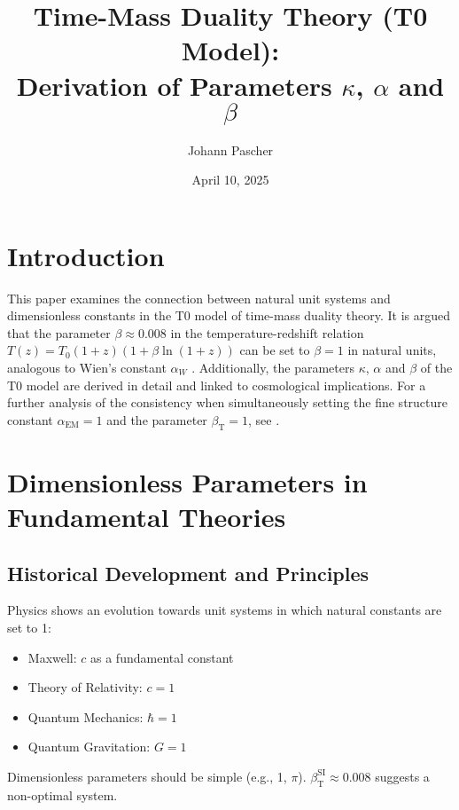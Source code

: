﻿\documentclass[12pt,a4paper]{article}
\newcommand{\alphaEM}{\alpha_{\text{EM}}}
\newcommand{\betaT}{\beta_{\text{T}}}
\begin{document}
	
	\title{Time-Mass Duality Theory (T0 Model): \\ Derivation of Parameters \(\kappa\), \(\alpha\) and \(\beta\)}
	\author{Johann Pascher}
	\date{April 10, 2025}
	
	\maketitle
	
	\section*{Introduction}
	
	This paper examines the connection between natural unit systems and dimensionless constants in the T0 model of time-mass duality theory. It is argued that the parameter \(\beta \approx 0.008\) in the temperature-redshift relation \(T(z) = T_0 (1+z)(1+\beta\ln(1+z))\) can be set to \(\beta = 1\) in natural units, analogous to Wien's constant \(\alpha_W\) \cite{pascher_temp_2025}. Additionally, the parameters \(\kappa\), \(\alpha\) and \(\beta\) of the T0 model are derived in detail and linked to cosmological implications. For a further analysis of the consistency when simultaneously setting the fine structure constant \(\alphaEM = 1\) and the parameter \(\betaT = 1\), see \cite{pascher_alphabeta_2025}.
	
	\tableofcontents
	\newpage
	
	\section{Dimensionless Parameters in Fundamental Theories}
	
	\subsection{Historical Development and Principles}
	
	Physics shows an evolution towards unit systems in which natural constants are set to 1:
	\begin{itemize}
		\item Maxwell: \(c\) as a fundamental constant
		\item Theory of Relativity: \(c = 1\)
		\item Quantum Mechanics: \(\hbar = 1\)
		\item Quantum Gravitation: \(G = 1\)
	\end{itemize}
	Dimensionless parameters should be simple (e.g., 1, \(\pi\)). \(\betaT^{\text{SI}} \approx 0.008\) suggests a non-optimal system.
	
\end{document}
